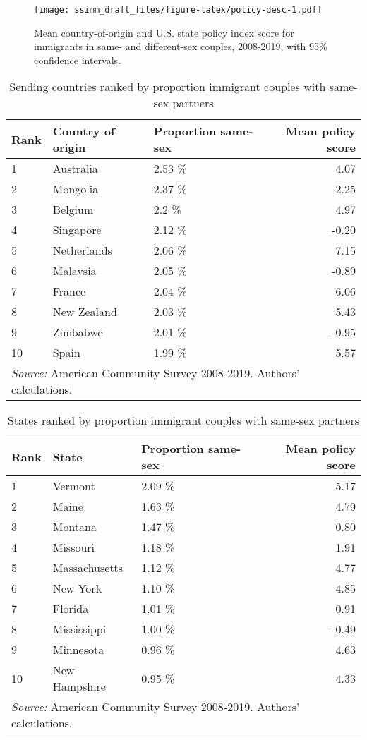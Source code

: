 \documentclass[
  11pt,
]{article}
\begin{document}
\begin{figure}
\centering
\texttt{[image: ssimm\_draft\_files/figure-latex/policy-desc-1.pdf]}
\caption{\label{fig:policy-desc}Mean country-of-origin and U.S. state policy index score for immigrants in same- and different-sex couples, 2008-2019, with 95\% confidence intervals.}
\end{figure}

\begin{table}

\caption{\label{tab:country-tab}Sending countries ranked by proportion immigrant couples with same-sex partners}
\centering
\begin{tabular}[t]{lllr}
\toprule
Rank & Country of origin & Proportion same-sex & Mean policy score\\
\midrule
1 & Australia & 2.53 \% & 4.07\\
2 & Mongolia & 2.37 \% & 2.25\\
3 & Belgium & 2.2 \% & 4.97\\
4 & Singapore & 2.12 \% & -0.20\\
5 & Netherlands & 2.06 \% & 7.15\\
6 & Malaysia & 2.05 \% & -0.89\\
7 & France & 2.04 \% & 6.06\\
8 & New Zealand & 2.03 \% & 5.43\\
9 & Zimbabwe & 2.01 \% & -0.95\\
10 & Spain & 1.99 \% & 5.57\\
\bottomrule
\multicolumn{4}{l}{\rule{0pt}{1em}\textit{Source:} American Community Survey 2008-2019. Authors' calculations.}\\
\end{tabular}
\end{table}

\begin{table}

\caption{\label{tab:state-tab}States ranked by proportion immigrant couples with same-sex partners}
\centering
\begin{tabular}[t]{lllr}
\toprule
Rank & State & Proportion same-sex & Mean policy score\\
\midrule
1 & Vermont & 2.09 \% & 5.17\\
2 & Maine & 1.63 \% & 4.79\\
3 & Montana & 1.47 \% & 0.80\\
4 & Missouri & 1.18 \% & 1.91\\
5 & Massachusetts & 1.12 \% & 4.77\\
6 & New York & 1.10 \% & 4.85\\
7 & Florida & 1.01 \% & 0.91\\
8 & Mississippi & 1.00 \% & -0.49\\
9 & Minnesota & 0.96 \% & 4.63\\
10 & New Hampshire & 0.95 \% & 4.33\\
\bottomrule
\multicolumn{4}{l}{\rule{0pt}{1em}\textit{Source:} American Community Survey 2008-2019. Authors' calculations.}\\
\end{tabular}
\end{table}
\end{document}
